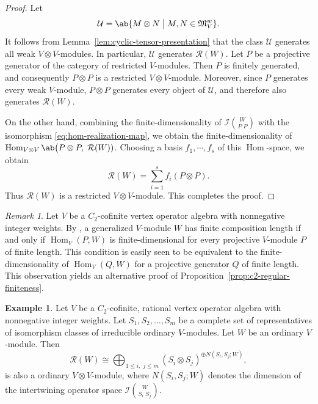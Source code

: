 \documentclass[12pt, english]{article}
\numberwithin{equation}{section}
\DeclareMathOperator{\Hom}{Hom}
\theoremstyle{plain}
\theoremstyle{definition}
\newtheorem{example}[lemma]{Example}
\theoremstyle{remark}
\newtheorem{remark}[lemma]{Remark}
\begin{document}
	\begin{proof}
		Let
		\[
		\mathcal{U} = \ab\{ M \otimes N \; \big| \; M, N \in \mathfrak{M}^w_V  \}.
		\]
		It follows from Lemma~\ref{lem:cyclic-tensor-presentation} that the class $\mathcal{U}$  generates all weak $V \otimes V$-modules.
		In particular,  $\mathcal{U}$ generates $\mathcal{R}(W)$.
		Let $P$ be a projective generator of the category of restricted $V$-modules.
		Then $P$ is finitely generated, and consequently $P\otimes P$ is a restricted $V \otimes V$-module.
		Moreover, since $P$ generates every weak $V$-module, $P \otimes P$ generates every object of $\mathcal{U}$, and therefore also generates $\mathcal{R}(W)$.
		
		On the other hand, combining the finite-dimensionality of $\mathcal{I} \binom{W}{P \; P}$
		with the isomorphism \eqref{eq:hom-realization-map}, we obtain the finite-dimensionality of $\Hom_{V \otimes V} \ab\big(P \otimes P, \; \mathcal{R}(W))$.
		Choosing a basis $f_1, \cdots, f_s$ of this $\Hom$-space, we obtain
		\[
		\mathcal{R}(W) = \sum_{i = 1}^s f_i(P \otimes P).
		\]
		Thus $\mathcal{R}(W)$ is a restricted $V\otimes V$-module. This completes the proof.
		
	\end{proof}
	
	\begin{remark}
		Let $V$ be a $C_2$-cofinite vertex operator algebra with nonnegative integer weights.
		By \cite[Lemma~3.29]{GZ26}, a generalized $V$-module $W$ has finite
		composition length if and only if $\Hom_V(P, W)$ is
		finite-dimensional for every projective $V$-module $P$ of finite length.
		This condition is easily seen to be equivalent to the finite-dimensionality of
		$\Hom_V(Q, W)$ for a projective generator $Q$ of finite length.
		This observation yields an alternative proof of Proposition~\ref{prop:c2-regular-finiteness}.
		
	\end{remark}
	
	\begin{example}
		Let $V$ be a $C_2$-cofinite, rational vertex operator algebra with nonnegative integer weights.
		Let $S_1, S_2, \dots, S_m$ be a complete set of representatives of isomorphism classes of irreducible ordinary $V$-modules.
		Let $W$ be an ordinary $V$-module. Then
		\[
		\mathcal{R}(W) \cong \bigoplus_{1 \leq i, \; j \leq m} (S_i \otimes S_j)^{\oplus N(S_i, S_j; W)},
		\]
		is also a  ordinary $V\otimes V$-module,  where $N(S_i, S_j;W)$ denotes the dimension of the intertwining operator space $\mathcal{I}\binom{W}{S_i\;S_j}$.
	\end{example}
	
\end{document}
